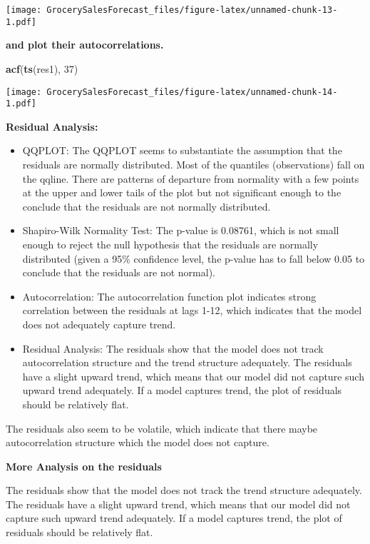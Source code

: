 \documentclass[
]{article}
\newenvironment{Shaded}{\begin{snugshade}}{\end{snugshade}}
\newcommand{\DecValTok}[1]{\textcolor[rgb]{0.00,0.00,0.81}{#1}}
\newcommand{\FunctionTok}[1]{\textcolor[rgb]{0.13,0.29,0.53}{\textbf{#1}}}
\newcommand{\NormalTok}[1]{#1}
\begin{document}
\texttt{[image: GrocerySalesForecast\_files/figure-latex/unnamed-chunk-13-1.pdf]}

\textbf{and plot their autocorrelations. }

\begin{Shaded}
\begin{Highlighting}[]
\FunctionTok{acf}\NormalTok{(}\FunctionTok{ts}\NormalTok{(res1), }\DecValTok{37}\NormalTok{)}
\end{Highlighting}
\end{Shaded}

\texttt{[image: GrocerySalesForecast\_files/figure-latex/unnamed-chunk-14-1.pdf]}

\textbf{Residual Analysis:}

\begin{itemize}
\item
  QQPLOT: The QQPLOT seems to substantiate the assumption that the
  residuals are normally distributed. Most of the quantiles
  (observations) fall on the qqline. There are patterns of departure
  from normality with a few points at the upper and lower tails of the
  plot but not significant enough to the conclude that the residuals are
  not normally distributed.
\item
  Shapiro-Wilk Normality Test: The p-value is 0.08761, which is not
  small enough to reject the null hypothesis that the residuals are
  normally distributed (given a 95\% confidence level, the p-value has
  to fall below 0.05 to conclude that the residuals are not normal).
\item
  Autocorrelation: The autocorrelation function plot indicates strong
  correlation between the residuals at lags 1-12, which indicates that
  the model does not adequately capture trend.
\item
  Residual Analysis: The residuals show that the model does not track
  autocorrelation structure and the trend structure adequately. The
  residuals have a slight upward trend, which means that our model did
  not capture such upward trend adequately. If a model captures trend,
  the plot of residuals should be relatively flat.
\end{itemize}

The residuals also seem to be volatile, which indicate that there maybe
autocorrelation structure which the model does not capture.

\textbf{More Analysis on the residuals}

The residuals show that the model does not track the trend structure
adequately. The residuals have a slight upward trend, which means that
our model did not capture such upward trend adequately. If a model
captures trend, the plot of residuals should be relatively flat.
\end{document}

